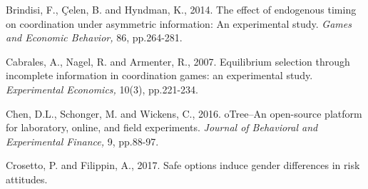 \documentclass[12pt, letterpaper]{article}
\theoremstyle{plain}
\begin{document}
\begin{thebibliography}{10}

 Brindisi, F., \c{C}elen, B. and Hyndman, K., 2014. The effect of endogenous timing on coordination under asymmetric information: An experimental study. \textit{Games and Economic Behavior,} 86, pp.264-281.

\bibitem{} Cabrales, A., Nagel, R. and Armenter, R., 2007. Equilibrium selection through incomplete information in coordination games: an experimental study. \textit{Experimental Economics,} 10(3), pp.221-234.



 Chen, D.L., Schonger, M. and Wickens, C., 2016. oTree--An open-source platform for laboratory, online, and field experiments. \textit{Journal of Behavioral and Experimental Finance,} 9, pp.88-97.



 Crosetto, P. and Filippin, A., 2017. Safe options induce gender differences in risk attitudes.





\end{thebibliography}
\end{document}
